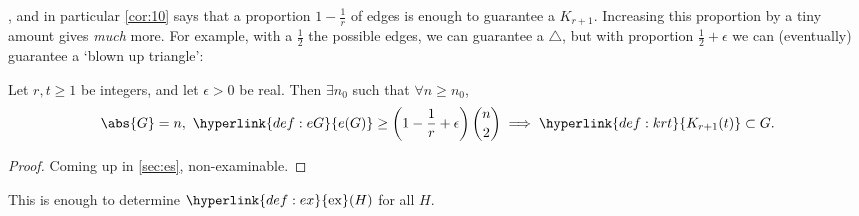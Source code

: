 \documentclass{article}
\DeclareMathOperator{\ext}{ex}
\begin{document}
\begin{fact}
    , and in particular \cref{cor:10} says that a proportion $1 - \frac{1}{r}$ of edges is enough to guarantee a $K_{r+1}$.
    Increasing this proportion by a tiny amount gives \emph{much} more.
    For example, with a $\frac{1}{2}$ the possible edges, we can guarantee a $\triangle$, but with proportion $\frac{1}{2} + \epsilon$ we can (eventually) guarantee a `blown up triangle':
    \begin{center}
    \end{center}
\end{fact}


\begin{nthm}\label{thm:14}
    Let $r, t \geq 1$ be integers, and let $\epsilon > 0$ be real.
    Then $\exists n_0$ such that $\forall n \geq n_0$,
    \begin{equation*}
        \abs{G} = n,\ \hyperlink{def:eG}{e(G)} \geq \left(1 - \frac{1}{r} + \epsilon\right) \binom{n}{2} \implies \hyperlink{def:krt}{K_{r+1}(t)} \subset G.
    \end{equation*}
\end{nthm}

\begin{proof}
    Coming up in \cref{sec:es}, non-examinable.
\end{proof}

This is enough to determine $\hyperlink{def:ex}{\ext}(H)$ for all $H$.
\end{document}
